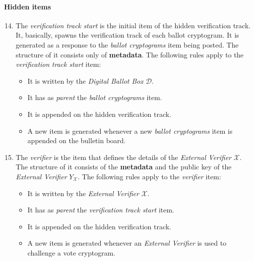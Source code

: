 \paragraph{Hidden items}
\begin{enumerate}
    \setcounter{enumi}{13}
    \item
        The \textit{verification track start} is the initial item of the hidden verification track. It, basically, spawns the verification track of each ballot cryptogram. It is generated as a response to the \textit{ballot cryptograms} item being posted.  The structure of it consists only of \textbf{metadata}. The following rules apply to the \textit{verification track start} item:
        \begin{itemize}
            \item It is written by the \textit{Digital Ballot Box} $\mathcal{D}$.
            \item It has as \textit{parent} the \textit{ballot cryptograms} item.
            \item It is appended on the hidden verification track.
            \item A new item is generated whenever a new \textit{ballot cryptograms} item is appended on the bulletin board.
        \end{itemize}
    
    \item
        The \textit{verifier} is the item that defines the details of the \textit{External Verifier} $\mathcal{X}$. The structure of it consists of the \textbf{metadata} and the public key of the \textit{External Verifier} $Y_\mathcal{X}$. The following rules apply to the \textit{verifier} item:
        \begin{itemize}
            \item It is written by the \textit{External Verifier} $\mathcal{X}$.
            \item It has as \textit{parent} the \textit{verification track start} item.
            \item It is appended on the hidden verification track.
            \item A new item is generated whenever an \textit{External Verifier} is used to challenge a vote cryptogram.
        \end{itemize}
    

\end{enumerate}
